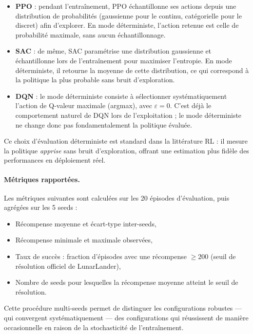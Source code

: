 \begin{itemize}
  \item \textbf{PPO} : pendant l'entraînement, PPO échantillonne ses actions depuis une distribution de probabilités (gaussienne pour le continu, catégorielle pour le discret) afin d'explorer. En mode déterministe, l'action retenue est celle de probabilité maximale, sans aucun échantillonnage.

  \item \textbf{SAC} : de même, SAC paramétrise une distribution gaussienne et échantillonne lors de l'entraînement pour maximiser l'entropie. En mode déterministe, il retourne la moyenne de cette distribution, ce qui correspond à la politique la plus probable sans bruit d'exploration.

  \item \textbf{DQN} : le mode déterministe consiste à sélectionner systématiquement l'action de Q-valeur maximale (argmax), avec $\varepsilon = 0$. C'est déjà le comportement naturel de DQN lors de l'exploitation ; le mode déterministe ne change donc pas fondamentalement la politique évaluée.
\end{itemize}


Ce choix d'évaluation déterministe est standard dans la littérature RL : il
mesure la politique \textit{apprise} sans bruit d'exploration, offrant une
estimation plus fidèle des performances en déploiement réel.

\paragraph{Métriques rapportées.}
Les métriques suivantes sont calculées sur les 20 épisodes d'évaluation, puis
agrégées sur les 5 seeds :

\begin{itemize}
  \item Récompense moyenne et écart-type inter-seeds,
  \item Récompense minimale et maximale observées,
  \item Taux de succès : fraction d'épisodes avec une récompense $\geq 200$
        (seuil de résolution officiel de LunarLander),
  \item Nombre de seeds pour lesquelles la récompense moyenne atteint le seuil
        de résolution.
\end{itemize}

Cette procédure multi-seeds permet de distinguer les configurations robustes
--- qui convergent systématiquement --- des configurations qui réussissent de
manière occasionnelle en raison de la stochasticité de l'entraînement.

